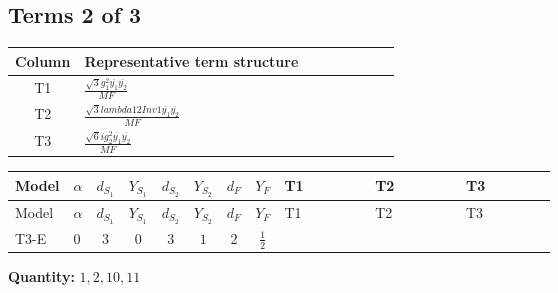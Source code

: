 \documentclass[8pt]{article}
\begin{document}
\begin{landscape}
\subsection*{Terms 2 of 3}
\begin{center}
\begin{tabular}{@{}c >{\raggedright\arraybackslash}p{0.82\linewidth}@{}}
\toprule
Column & Representative term structure \\
\midrule
T1 & \(\displaystyle \frac{\sqrt{3} g_{1}^{2} \overline{y_{1}} \overline{y_{2}}}{MF}\) \\
\midrule
T2 & \(\displaystyle \frac{\sqrt{3} lambda12Inv1 \overline{y_{1}} \overline{y_{2}}}{MF}\) \\
\midrule
T3 & \(\displaystyle \frac{\sqrt{6} i g_{2}^{2} \overline{y_{1}} \overline{y_{2}}}{MF}\) \\
\midrule
\bottomrule
\end{tabular}
\end{center}
\smallskip
\tiny
\begin{longtable}{@{}llcccccc >{\raggedright\arraybackslash}p{0.21\linewidth} >{\raggedright\arraybackslash}p{0.21\linewidth} >{\raggedright\arraybackslash}p{0.21\linewidth}@{}}
\toprule
Model & $\alpha$ & $d_{S_1}$ & $Y_{S_1}$ & $d_{S_2}$ & $Y_{S_2}$ & $d_F$ & $Y_F$ & T1 & T2 & T3 \\
\midrule
\endfirsthead
\toprule
Model & $\alpha$ & $d_{S_1}$ & $Y_{S_1}$ & $d_{S_2}$ & $Y_{S_2}$ & $d_F$ & $Y_F$ & T1 & T2 & T3 \\
\midrule
\endhead
T3-E & $0$ & $3$ & $0$ & $3$ & $1$ & $2$ & $\frac{1}{2}$ & \scriptsize\adjustbox{max width=\linewidth}{$\begin{gathered} - \frac{\sqrt{3} g_{1}^{2} \overline{y_{1}} \overline{y_{2}}}{8 MF}\end{gathered}$} & \scriptsize\adjustbox{max width=\linewidth}{$\begin{gathered} \frac{\sqrt{3} lambda12Inv1 \overline{y_{1}} \overline{y_{2}}}{6 MF}\end{gathered}$} & \scriptsize\adjustbox{max width=\linewidth}{$\begin{gathered} \frac{\sqrt{6} i g_{2}^{2} \overline{y_{1}} \overline{y_{2}}}{6 MF}\end{gathered}$} \\
\midrule
\bottomrule
\end{longtable}
\clearpage
\noindent\textbf{Quantity: }$\mathrm{1,2,10,11}$\par\smallskip

\end{landscape}
\end{document}
